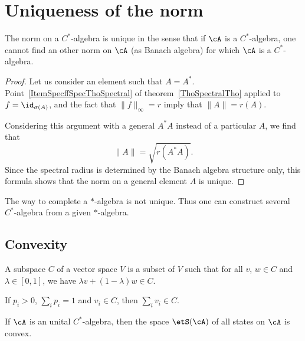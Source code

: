 \section{Uniqueness of the norm}

\begin{proposition}         \label{prop:unicitenormcsa}
	The norm on a $C^*$-algebra is unique in the sense that if $\cA$ is a $C^*$-algebra, one cannot find an other norm on $\cA$ (as Banach algebra) for which $\cA$ is a $C^*$-algebra.
\end{proposition}

\begin{proof}
	Let us consider an element such that $A=A^*$. Point~\ref{ItemSpecffSpecThoSpectral} of theorem~\ref{ThoSpectralTho} applied to $f=\id_{\sigma(A)}$, and the fact that $\| f \|_{\infty}=r$ imply that $\| A \|=r(A)$.

	Considering this argument with a general $A^*A$ instead of a particular $A$, we find that
	\begin{equation}
		\| A \|=\sqrt{r(A^*A)}.
	\end{equation}
	Since the spectral radius is determined by the Banach algebra structure only, this formula shows that the norm on a general element $A$ is unique.

\end{proof}

\begin{remark}
	The way to complete a $*$-algebra is not unique. Thus one can construct several $C^*$-algebra from a given $*$-algebra.
\end{remark}

\subsection{Convexity}

A  subspace $C$ of a vector space $V$ is a subset of $V$ such that for all $v$, $w\in C$ and $\lambda\in[0,1]$, we have $\lambda v+(1-\lambda)w\in C$.

If $p_i>0$, $\sum_ip_i=1$ and $v_i\in C$, then $\sum_i v_i\in C$.

\begin{lemma}
	If $\cA$ is an unital $C^*$-algebra, then the space $\etS(\cA)$ of all states on $\cA$ is convex.
\end{lemma}

